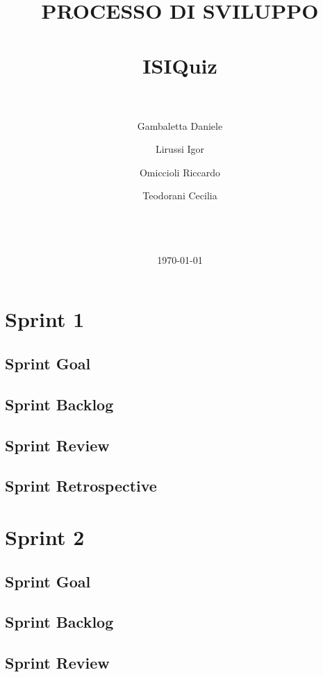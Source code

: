 \documentclass{report}
\title{\LARGE
    PROCESSO DI SVILUPPO \\
    \hrulefill \\
    \textbf{ISIQuiz} \\ 
    \hrulefill \\
}
\author{
    Gambaletta Daniele \\ \emailaddr{daniele.gambaletta@studio.unibo.it}
    \and
    Lirussi Igor \\ \emailaddr{igor.lirussi@studio.unibo.it}
    \and 
    Omiccioli Riccardo \\ \emailaddr{riccardo.omiccioli@studio.unibo.it} 
    \and 
    Teodorani Cecilia \\ \emailaddr{cecilia.teodorani@studio.unibo.it} 
    \\ \\ \\ 
}
\date{\today}
\begin{document}
\renewcommand{\labelenumii}{\arabic{enumi}.\arabic{enumii}}
\renewcommand{\labelenumiii}{\arabic{enumi}.\arabic{enumii}.\arabic{enumiii}}
\renewcommand{\labelenumiv}{\arabic{enumi}.\arabic{enumii}.\arabic{enumiii}.\arabic{enumiv}}

\maketitle
\tableofcontents

\setcounter{chapter}{-1}
    
    
    \chapter{Sprint 1}
    \section{Sprint Goal}
        
    \section{Sprint Backlog}
        
    \section{Sprint Review}
        
    \section{Sprint Retrospective}
        
    
    \chapter{Sprint 2}
    \section{Sprint Goal}
        
    \section{Sprint Backlog}
        
    \section{Sprint Review}
        
\end{document}
